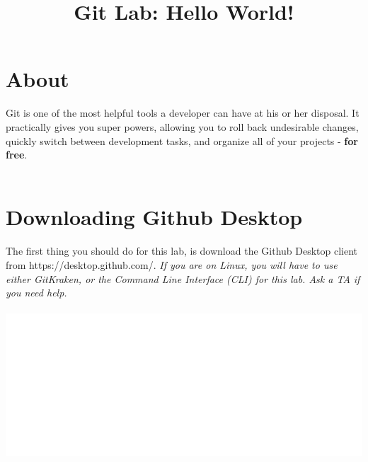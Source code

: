 \documentclass[12pt, letter]{article}
\title{Git Lab: Hello World!}
\begin{document}
    \maketitle
    \tableofcontents
    
    \section{About}
    Git is one of the most helpful tools a developer can have at his or her disposal. It practically gives you super powers, allowing you to roll back undesirable changes, quickly switch between development tasks, and organize all of your projects - \textbf{for free}. \\ \\
    
    \section{Downloading Github Desktop}
    The first thing you should do for this lab, is download the Github Desktop client from https://desktop.github.com/. \emph{If you are on Linux, you will have to use either GitKraken, or the Command Line Interface (CLI) for this lab. Ask a TA if you need help.} \\ \\
    \includegraphics{screenshots/shot01.bmp}
    
\end{document}
